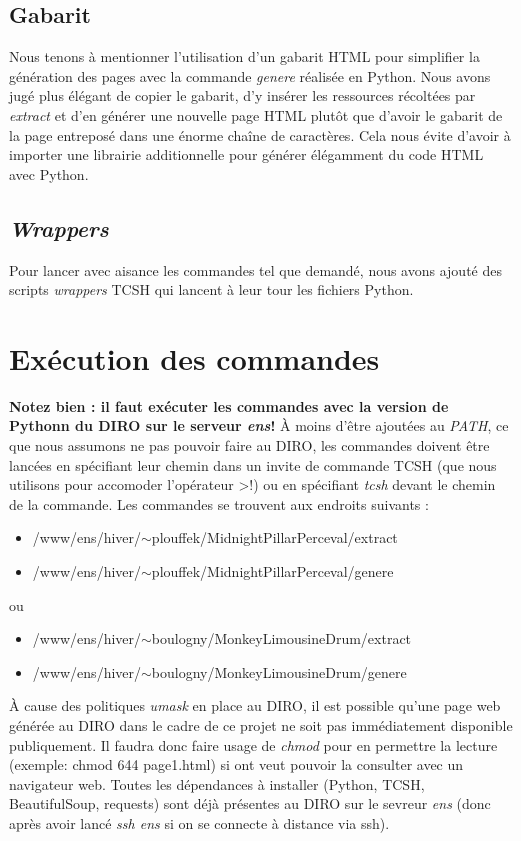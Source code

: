 \documentclass{article}
\begin{document}
\subsection{Gabarit}
Nous tenons à mentionner l'utilisation d'un gabarit HTML pour simplifier la génération des pages avec la commande \textit{genere} réalisée en Python.
Nous avons jugé plus élégant de copier le gabarit, d'y insérer les ressources récoltées par \textit{extract} et d'en générer une nouvelle page HTML plutôt que d'avoir le gabarit de la page entreposé dans une énorme chaîne de caractères.
Cela nous évite d'avoir à importer une librairie additionnelle pour générer élégamment du code HTML avec Python.

\subsection{\textit{Wrappers}}
Pour lancer avec aisance les commandes tel que demandé, nous avons ajouté des scripts \textit{wrappers} TCSH qui lancent à leur tour les fichiers Python.

\section{Exécution des commandes}
\textbf{Notez bien : il faut exécuter les commandes avec la version de Pythonn du DIRO sur le serveur \textit{ens}!} 
À moins d'être ajoutées au \textit{PATH}, ce que nous assumons ne pas pouvoir faire au DIRO, 
les commandes doivent être lancées en spécifiant leur chemin dans un invite de commande TCSH
(que nous utilisons pour accomoder l'opérateur >!)
ou en spécifiant \textit{tcsh} devant le chemin de la commande.
Les commandes se trouvent aux endroits suivants :
\begin{itemize}
  \item /www/ens/hiver/$\sim$plouffek/MidnightPillarPerceval/extract
  \item /www/ens/hiver/$\sim$plouffek/MidnightPillarPerceval/genere
\end{itemize}
ou
\begin{itemize}
  \item /www/ens/hiver/$\sim$boulogny/MonkeyLimousineDrum/extract
  \item /www/ens/hiver/$\sim$boulogny/MonkeyLimousineDrum/genere
\end{itemize}
À cause des politiques \textit{umask} en place au DIRO, 
il est possible qu'une page web générée au DIRO dans le cadre de ce projet ne soit pas immédiatement disponible publiquement.
Il faudra donc faire usage de \textit{chmod} pour en permettre la lecture (exemple: chmod 644 page1.html) si ont veut pouvoir la consulter avec un navigateur web.
\newline
Toutes les dépendances à installer (Python, TCSH, BeautifulSoup, requests) sont déjà présentes au DIRO sur le sevreur \textit{ens} 
(donc après avoir lancé \textit{ssh ens} si on se connecte à distance via ssh).
\end{document}
